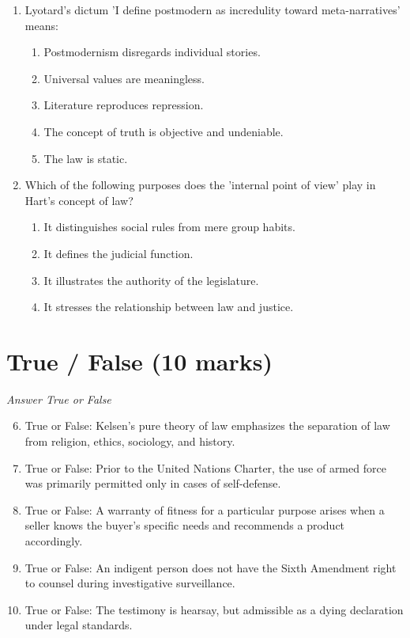 \documentclass[12pt]{article}
\begin{document}
\begin{enumerate}[label=\arabic*.]
\begin{enumerate}[label=(\alph*)]
    \item 'Men are more inclined towards justice, while women tend to focus on fairness.'
    \item There are fundamental differences between individual women.'
\end{enumerate}
\item Lyotard's dictum 'I define postmodern as incredulity toward meta-narratives' means:
\begin{enumerate}[label=(\alph*)]
    \item Postmodernism disregards individual stories.
    \item Universal values are meaningless.
    \item Literature reproduces repression.
    \item The concept of truth is objective and undeniable.
    \item The law is static.
\end{enumerate}
\item Which of the following purposes does the 'internal point of view' play in Hart's concept of law?
\begin{enumerate}[label=(\alph*)]
    \item It distinguishes social rules from mere group habits.
    \item It defines the judicial function.
    \item It illustrates the authority of the legislature.
    \item It stresses the relationship between law and justice.
\end{enumerate}
\end{enumerate}

\section*{True / False (10 marks)}
\textit{Answer True or False}
\begin{enumerate}[label=\arabic*.]
\setcounter{enumi}{5}
\item True or False: Kelsen's pure theory of law emphasizes the separation of law from religion, ethics, sociology, and history.
\item True or False: Prior to the United Nations Charter, the use of armed force was primarily permitted only in cases of self-defense.
\item True or False: A warranty of fitness for a particular purpose arises when a seller knows the buyer's specific needs and recommends a product accordingly.
\item True or False: An indigent person does not have the Sixth Amendment right to counsel during investigative surveillance.
\item True or False: The testimony is hearsay, but admissible as a dying declaration under legal standards.
\end{enumerate}
\end{document}
